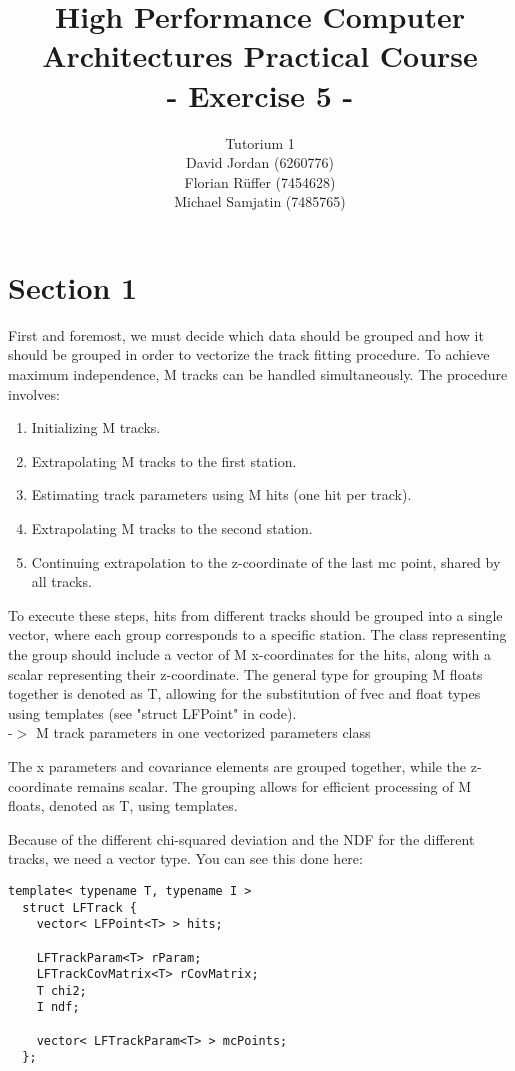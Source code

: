 \documentclass{article}
\title{\textbf{High Performance Computer Architectures Practical Course \\ - Exercise 5 -} \\[10mm]}
\author{Tutorium 1 \\[10mm] David Jordan (6260776) \\[1mm] Florian Rüffer (7454628) \\[1mm] Michael Samjatin (7485765) \\[10mm]}
\begin{document}
\maketitle
\newpage
\section*{Section 1}

First and foremost, we must decide which data should be
grouped and how it should be grouped in order to vectorize
the track fitting procedure.
To achieve maximum independence, M tracks can be handled simultaneously.
The procedure involves:

\begin{enumerate}
\item Initializing M tracks.
\item Extrapolating M tracks to the first station.
\item Estimating track parameters using M hits (one hit per track).
\item Extrapolating M tracks to the second station.
\item Continuing extrapolation to the z-coordinate of the last mc point, shared by all tracks.
\end{enumerate}

To execute these steps, hits from different tracks should be grouped
into a single vector, where each group corresponds to a specific station.
The class representing the group should include a vector of M x-coordinates
for the hits, along with a scalar representing their z-coordinate. The
general type for grouping M floats together is denoted as T, allowing
for the substitution of fvec and float types using templates
(see "struct LFPoint" in code).\\
-$>$ M track parameters in one vectorized parameters class

The x parameters and covariance elements
are grouped together, while the z-coordinate remains
scalar. The grouping allows for efficient processing
of M floats, denoted as T, using templates.

Because of the different chi-squared deviation and the
NDF for the different tracks, we need a vector type.
You can see this done here:\\
\begin{lstlisting}[caption=KFLineFitter.cpp]
  template< typename T, typename I >
  struct LFTrack {
    vector< LFPoint<T> > hits;
    
    LFTrackParam<T> rParam;
    LFTrackCovMatrix<T> rCovMatrix;
    T chi2;
    I ndf;
  
    vector< LFTrackParam<T> > mcPoints;
  };
\end{lstlisting}
\end{document}
